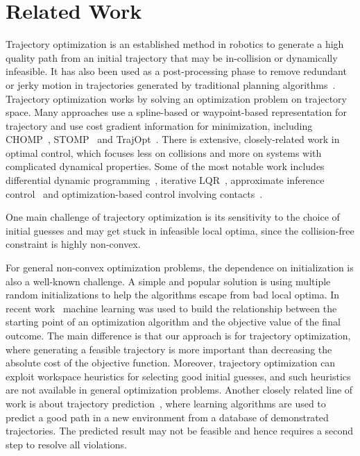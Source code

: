 \documentclass[letterpaper, 10 pt, conference]{ieeeconf}  %
\begin{document}
\section{Related Work}
\label{sec:related}
Trajectory optimization is an established method in robotics to generate a high quality path from an initial trajectory that may be in-collision or dynamically infeasible. It has also been used as a post-processing phase to remove redundant or jerky motion in trajectories generated by traditional planning algorithms~\cite{Latombe:1991:RMP,Lavalle:2006:PA}. Trajectory optimization works by solving an optimization problem on trajectory space. Many approaches use a spline-based or waypoint-based representation for trajectory and use cost gradient information for minimization, including CHOMP~\cite{Ratliff:2009:CGO}, STOMP~\cite{Kalakrishnan:2011:STOMP} and TrajOpt~\cite{Schulman:2013:FLO}. There is extensive, closely-related work in optimal control, which focuses less on collisions and more on systems with complicated dynamical properties. Some of the most notable work includes differential dynamic programming~\cite{Jacobson:1970:DDP,Atkeson:1994:ULT}, iterative LQR~\cite{Todorvo:2005:iLQG}, approximate inference control~\cite{Toussaint:2009:RTO} and optimization-based control involving contacts~\cite{Mordatch:2012:DCB,Tassa:2012:SSC,Erez:2012:TOD,Posa:2013:DTO}. 

One main challenge of trajectory optimization is its sensitivity to the choice of initial guesses and may get stuck in infeasible local optima, since the collision-free constraint is highly non-convex.

For general non-convex optimization problems, the dependence on initialization is also a well-known challenge. A simple and popular solution is using multiple random initializations to help the algorithms escape from bad local optima. 
In recent work~\cite{Cassioli:2012:MLG} machine learning was used to build the relationship between the starting point of an optimization algorithm and the objective value of the final outcome. The main difference is that our approach is for trajectory optimization, where generating a feasible trajectory is more important than decreasing the absolute cost of the objective function. Moreover, trajectory optimization can exploit workspace heuristics for selecting good initial guesses, and such heuristics are not available in general optimization problems. Another closely related line of work is about trajectory prediction~\cite{Jetchev:2013:FMP}, where learning algorithms are used to predict a good path in a new environment from a database of demonstrated trajectories. The predicted result may not be feasible and hence requires a second step to resolve all violations.
\end{document}
